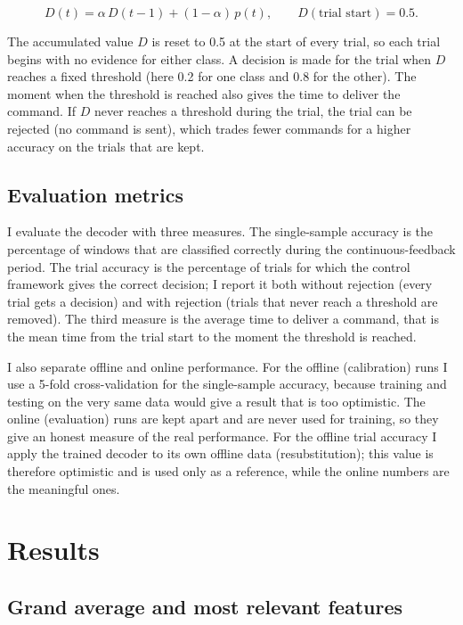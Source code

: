 \documentclass[10pt,twocolumn,a4paper]{article}
\begin{document}
\begin{equation}
\label{eq:control}
D(t) = \alpha\,D(t-1) + (1-\alpha)\,p(t),
\qquad D(\text{trial start}) = 0.5 .
\end{equation}

The accumulated value $D$ is reset to 0.5 at the start of every trial, so each
trial begins with no evidence for either class. A decision is made for the trial
when $D$ reaches a fixed threshold (here 0.2 for one class and 0.8 for the
other). The moment when the threshold is reached also gives the time to deliver
the command. If $D$ never reaches a threshold during the trial, the trial can be
rejected (no command is sent), which trades fewer commands for a higher accuracy
on the trials that are kept.

\subsection{Evaluation metrics}
\label{sec:metrics}

I evaluate the decoder with three measures. The single-sample accuracy is the
percentage of windows that are classified correctly during the
continuous-feedback period. The trial accuracy is the percentage of trials for
which the control framework gives the correct decision; I report it both without
rejection (every trial gets a decision) and with rejection (trials that never
reach a threshold are removed). The third measure is the average time to deliver
a command, that is the mean time from the trial start to the moment the threshold
is reached.

I also separate offline and online performance. For the offline (calibration)
runs I use a 5-fold cross-validation for the single-sample accuracy, because
training and testing on the very same data would give a result that is too
optimistic. The online (evaluation) runs are kept apart and are never used for
training, so they give an honest measure of the real performance. For the offline
trial accuracy I apply the trained decoder to its own offline data
(resubstitution); this value is therefore optimistic and is used only as a
reference, while the online numbers are the meaningful ones.

\section{Results}

\subsection{Grand average and most relevant features}
\label{sec:res-ga}
\end{document}
